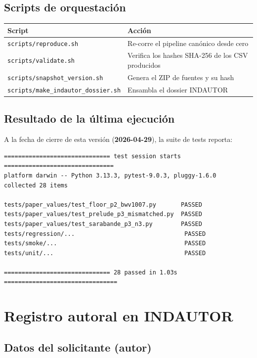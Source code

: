 \documentclass[11pt,a4paper,oneside]{article}
\theoremstyle{plain}
\theoremstyle{definition}
\theoremstyle{remark}
\newcommand{\code}[1]{\texttt{\small #1}}
\begin{document}
\subsection{Scripts de orquestación}

\begin{tabularx}{\linewidth}{lX}
  \toprule
  \textbf{Script} & \textbf{Acción} \\
  \midrule
  \code{scripts/reproduce.sh} & Re-corre el pipeline canónico desde cero \\
  \code{scripts/validate.sh}  & Verifica los hashes SHA-256 de los CSV producidos \\
  \code{scripts/snapshot\_version.sh} & Genera el ZIP de fuentes y su hash \\
  \code{scripts/make\_indautor\_dossier.sh} & Ensambla el dossier INDAUTOR \\
  \bottomrule
\end{tabularx}

\subsection{Resultado de la última ejecución}

A la fecha de cierre de esta versión (\textbf{2026-04-29}), la suite de
tests reporta:

\begin{lstlisting}[style=plain]
============================== test session starts ===============================
platform darwin -- Python 3.13.3, pytest-9.0.3, pluggy-1.6.0
collected 28 items

tests/paper_values/test_floor_p2_bwv1007.py       PASSED
tests/paper_values/test_prelude_p3_mismatched.py  PASSED
tests/paper_values/test_sarabande_p3_n3.py        PASSED
tests/regression/...                               PASSED
tests/smoke/...                                    PASSED
tests/unit/...                                     PASSED

============================== 28 passed in 1.03s ================================
\end{lstlisting}

\section{Registro autoral en INDAUTOR}\label{sec:indautor}

\subsection{Datos del solicitante (autor)}
\end{document}
